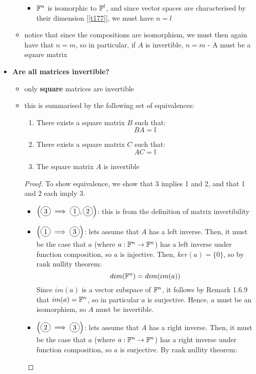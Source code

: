 \documentclass{exam}
\begin{document}
\begin{itemize}
\begin{itemize}
\begin{itemize}
            \item $\mathbb{F}^n$ is isomorphic to $\mathbb{F}^l$, and since vector spaces are characterised by their dimension [\eqref{t177}], we must have $n = l$
        \end{itemize}
        \item notice that since the compositions are isomorphism, we must then again have that $n = m$, so in particular, if $A$ is invertible, $n = m$ - A must be a square matrix
    \end{itemize}
    \item \textbf{Are all matrices invertible?}
    \begin{itemize}
        \item only \textbf{square} matrices are invertible
        \item this is summarised by the following set of equivalences:
        \begin{enumerate}
            \item There exists a square matrix $B$ such that:
            \[
            BA = \mathbb{I}
            \]
            \item There exists a square matrix $C$ such that:
            \[
            AC = \mathbb{I}
            \]
            \item The square matrix $A$ is invertible
        \end{enumerate}
        \begin{proof}
        To show equivalence, we show that 3 implies 1 and 2, and that 1 and 2 each imply 3.
        \begin{itemize}
            \item $\left(\circled{3} \implies \circled{1}, \circled{2}\right)$: this is from the definition of matrix invertibility
            \item $\left(\circled{1} \implies \circled{3}\right)$: lets assume that $A$ has a left inverse. Then, it must be the case that $a$ (where $a : \mathbb{F}^n \to \mathbb{F}^n$) has a left inverse under function composition, so $a$ is injective. Then, $ker(a) = \{0\}$, so by rank nullity theorem:
            \[
            dim(\mathbb{F}^n) = dim(im(a))
            \]
            Since $im(a)$ is a vector subspace of $\mathbb{F}^n$, it follows by Remark 1.6.9 that $im(a) = \mathbb{F}^n$, so in particular $a$ is surjective. Hence, $a$ must be an isomorphism, so $A$ must be invertible.
            \item $\left(\circled{2} \implies \circled{3}\right)$: lets assume that $A$ has a right inverse. Then, it must be the case that $a$ (where $a : \mathbb{F}^n \to \mathbb{F}^n$) has a right inverse under function composition, so $a$ is surjective. By rank nullity theorem:

\end{itemize}
\end{proof}
\end{itemize}
\end{itemize}
\end{document}
